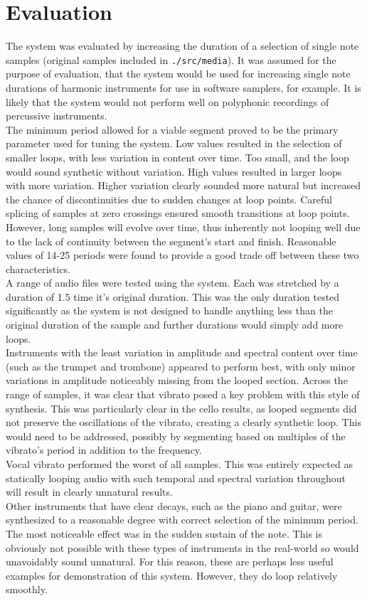 \documentclass[titlepage]{scrartcl}
\begin{document}
\section{Evaluation}
The system was evaluated by increasing the duration of a selection of single
note samples (original samples included in \texttt{./src/media}). It was
assumed for the purpose of evaluation, that the system would be used for
increasing single note durations of harmonic instruments for use in software
samplers, for example. It is likely that the system would not perform well on
polyphonic recordings of percussive instruments.\\
The minimum period allowed for a viable segment proved to be the primary
parameter used for tuning the system.  Low values resulted in the selection of
smaller loops, with less variation in content over time. Too small, and the
loop would sound synthetic without variation. High values resulted in larger
loops with more variation. Higher variation clearly sounded more natural but
increased the chance of discontinuities due to sudden changes at loop points.
Careful splicing of samples at zero crossings ensured smooth transitions at
loop points.  However, long samples will evolve over time, thus inherently not
looping well due to the lack of continuity between the segment's start and
finish. Reasonable values of 14-25 periods were found to provide a good trade off
between these two characteristics.\\
A range of audio files were tested using the system. Each was stretched by a
duration of 1.5 time it's original duration. This was the only duration tested
significantly as the system is not designed to handle anything less than the
original duration of the sample and further durations would simply add more
loops.\\
Instruments with the least variation in amplitude and spectral content over
time (such as the trumpet and trombone) appeared to perform best, with only
minor variations in amplitude noticeably missing from the looped section.
Across the range of samples, it was clear that vibrato posed a key problem
with this style of synthesis. This was particularly clear in the cello results,
as looped segments did not preserve the oscillations of the vibrato, creating a
clearly synthetic loop. This would need to be addressed, possibly by segmenting
based on multiples of the vibrato's period in addition to the frequency.\\
Vocal vibrato performed the worst of all samples. This was entirely expected as
statically looping audio with such temporal and spectral variation throughout
will result in clearly unnatural results.\\
Other instruments that have clear decays, such as the piano and guitar, were
synthesized to a reasonable degree with correct selection of the minimum
period. The most noticeable effect was in the sudden sustain of the note. This
is obviously not possible with these types of instruments in the real-world so
would unavoidably sound unnatural. For this reason, these are perhaps less
useful examples for demonstration of this system. However, they do loop
relatively smoothly.
\end{document}

